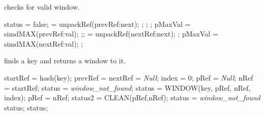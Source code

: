 \documentclass[11pt,onecolumn]{IEEEtran}
\begin{document}
\begin{algorithm}
  \caption{checks for valid window.}
  \label{alg:window}
  \begin{algorithmic}[1]
    \Statex   
      \State status = false;
         = unpackRef(prevRef:next);
          \State 
          ; ; 
        \EndIf
          \State 
          ; 
        \EndIf
        \State pMaxVal = simdMAX(prevRef:val);  
          \State 
          ;; 
        \EndIf
      \EndIf
       = unpackRef(nextRef:next);
        \State 
        ; 
      \EndIf
      \State pMaxVal = simdMAX(nextRef:val);  
        \State 
        ;
      \Else
          \State
        \Else
          \State
        \EndIf
      \EndIf
    \EndFunction
  \end{algorithmic}
\end{algorithm}

\begin{algorithm}
  \caption{finds a key and returns a window to it.}
  \label{alg:find}
  \begin{algorithmic}[1]
    \Statex   
      \State startRef = hash(key);
      \State prevRef = nextRef = {\it Null};
      \State index = 0;      
        \State pRef = {\it Null};
        \State nRef = startRef;
        \State status = {\it window\_not\_found};
          \State status = WINDOW(key, pRef, nRef, index);
            \State pRef = nRef;
            \State status2 = CLEAN(pRef,nRef);
              \State status = {\it window\_not\_found}
            \EndIf
          \EndIf
        \EndWhile
          \State
          \Return status;
        \EndIf
          \State
          \Return status;
        \EndIf
      \EndWhile
    \EndFunction
  \end{algorithmic}
\end{algorithm}
\end{document}
